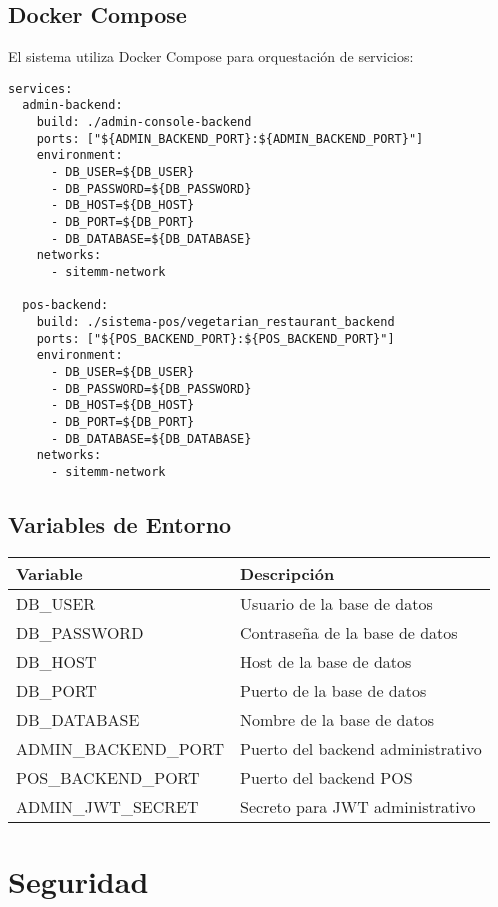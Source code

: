 \documentclass[12pt,a4paper]{article}
\begin{document}
\subsection{Docker Compose}
El sistema utiliza Docker Compose para orquestación de servicios:

\begin{verbatim}
services:
  admin-backend:
    build: ./admin-console-backend
    ports: ["${ADMIN_BACKEND_PORT}:${ADMIN_BACKEND_PORT}"]
    environment:
      - DB_USER=${DB_USER}
      - DB_PASSWORD=${DB_PASSWORD}
      - DB_HOST=${DB_HOST}
      - DB_PORT=${DB_PORT}
      - DB_DATABASE=${DB_DATABASE}
    networks:
      - sitemm-network

  pos-backend:
    build: ./sistema-pos/vegetarian_restaurant_backend
    ports: ["${POS_BACKEND_PORT}:${POS_BACKEND_PORT}"]
    environment:
      - DB_USER=${DB_USER}
      - DB_PASSWORD=${DB_PASSWORD}
      - DB_HOST=${DB_HOST}
      - DB_PORT=${DB_PORT}
      - DB_DATABASE=${DB_DATABASE}
    networks:
      - sitemm-network
\end{verbatim}

\subsection{Variables de Entorno}
\begin{longtable}{|p{3cm}|p{10cm}|}
\hline
\textbf{Variable} & \textbf{Descripción} \\
\hline
\endhead
DB\_USER & Usuario de la base de datos \\
\hline
DB\_PASSWORD & Contraseña de la base de datos \\
\hline
DB\_HOST & Host de la base de datos \\
\hline
DB\_PORT & Puerto de la base de datos \\
\hline
DB\_DATABASE & Nombre de la base de datos \\
\hline
ADMIN\_BACKEND\_PORT & Puerto del backend administrativo \\
\hline
POS\_BACKEND\_PORT & Puerto del backend POS \\
\hline
ADMIN\_JWT\_SECRET & Secreto para JWT administrativo \\
\hline
\end{longtable}

\section{Seguridad}
\end{document}
